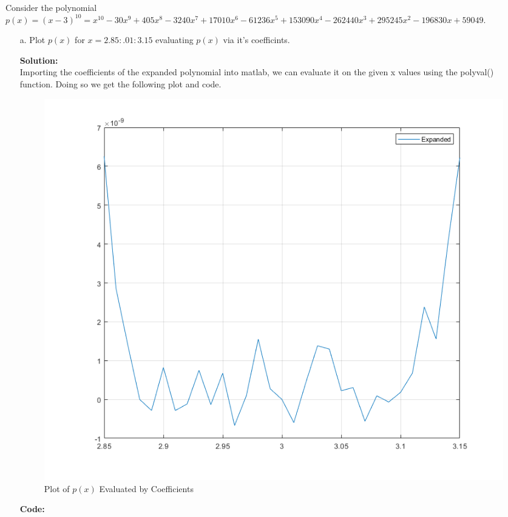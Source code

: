 \documentclass[12pt]{article}
\makeatletter
\theoremstyle{homework}
\newenvironment{exercise}[1]
{\def\@currentlabel{#1}\exercisecore}
{\endexercisecore}
\newcommand{\localhead}[1]{\par\smallskip\noindent\textbf{#1}\nobreak\\}%
\newcommand\solution{\localhead{Solution:}}
\makeatother
\begin{document}
\begin{exercise}{P19} Consider the polynomial $p(x) = (x - 3)^{10} = x^{10}-30x^9+405x^8-3240x^7+17010x^6-61236x^5+153090x^4-262440x^3+295245x^2-196830x+59049.$\\
  \begin{enumerate}
    \item[a.] Plot $p(x)$ for $x = 2.85:.01:3.15$ evaluating $p(x)$ via it's coefficints.\\
    \solution Importing the coefficients of the expanded polynomial into matlab, we can evaluate it on the given x values using the polyval() function. Doing so we 
    get the following plot and code.
    \begin{figure}[H]
      \begin{center}
        \caption{Plot of $p(x)$ Evaluated by Coefficients}
         \includegraphics[width=.90\textwidth]{Fig01.png}
      \end{center}
    \end{figure}
    \textbf{Code:}
    \begin{center}
      
    \end{center}



\end{enumerate}
\end{exercise}
\end{document}
